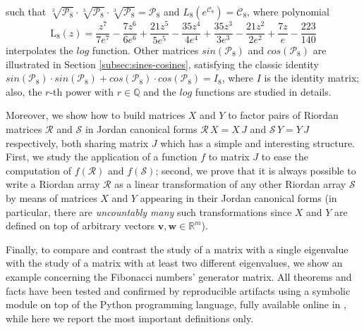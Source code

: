 such that %
$\sqrt[3]{\mathcal{P}_8} \cdot \sqrt[3]{\mathcal{P}_8} \cdot
\sqrt[3]{\mathcal{P}_8} =\mathcal{P}_8$ and
$L_{8}\left({e^{\mathcal{C}_{8}}}\right) = \mathcal{C}_{8}$, where polynomial
\begin{displaymath}
\operatorname{L_{ 8 }}{\left (z \right )} = \frac{z^{7}}{7 e^{7}} - \frac{7 z^{6}}{6 e^{6}} + \frac{21 z^{5}}{5 e^{5}} - \frac{35 z^{4}}{4 e^{4}} + \frac{35 z^{3}}{3 e^{3}} - \frac{21 z^{2}}{2 e^{2}} + \frac{7 z}{e} - \frac{223}{140}
\end{displaymath}
interpolates the $log$ function. Other matrices $sin(\mathcal{P}_8)$ and
$cos(\mathcal{P}_8)$ are illustrated in Section \ref{subsec:sines-cosines},
satisfying the classic identity $sin(\mathcal{P}_8)\cdot sin(\mathcal{P}_8)+
cos(\mathcal{P}_8)\cdot cos(\mathcal{P}_8)=I_{8}$, where $I$ is the identity
matrix; also, the $r$-th power with $r\in\mathbb{Q}$ and the $log$ functions
are studied in details.

Moreover, we show how to build matrices $X$ and $Y$ to factor pairs of Riordan
matrices $\mathcal{R}$ and $\mathcal{S}$ in  Jordan canonical forms
$\mathcal{R}\,X=X\,J$ and $\mathcal{S}\,Y=Y\,J$ respectively, both sharing
matrix $J$ which has a simple and interesting structure. First, we study the
application of a function $f$ to matrix $J$  to ease the computation of
$f(\mathcal{R})$ and $f(\mathcal{S})$; second, we prove that it is always
possible to write a Riordan array $\mathcal{R}$ as a linear transformation of
any other Riordan array $\mathcal{S}$ by means of matrices $X$ and $Y$
appearing in their Jordan canonical forms (in particular, there are
\textit{uncountably many} such transformations since $X$ and $Y$ are defined on
top of arbitrary vectors $\boldsymbol{v},\boldsymbol{w}\in\mathbb{R}^{m}$).

Finally, to compare and contrast the study of a matrix with a single eigenvalue
with the study of a matrix with at least two different eigenvalues, we show an
example concerning the Fibonacci numbers' generator matrix.  All theorems and
facts have been tested and confirmed by reproducible artifacts using a symbolic
module on top of the Python programming language, fully available online in
\citep{MN:simulation:method:repo}, while here we report the most important
definitions only.



